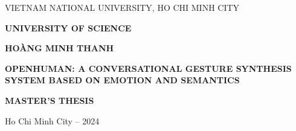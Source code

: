 \begin{titlepage}
	
	\begin{mdframed}[linewidth=1pt,
		linecolor=black,
		leftmargin=0,
		rightmargin=0,
		innertopmargin=20mm,
		innerbottommargin=20mm,
		innerleftmargin=25mm,
		innerrightmargin=25mm,
		skipabove=0,
		skipbelow=0]
		
		\centering
		\vspace*{1cm}
		
		{VIETNAM NATIONAL UNIVERSITY, HO CHI MINH CITY\par}
		\vspace{0.25cm}
		{\large \textbf{UNIVERSITY OF SCIENCE}\par}
		
		\vspace{2cm}
		
		{\large \MakeUppercase{\textbf{HOÀNG MINH THANH}}\par}
		
		\vspace{2cm}
		
		{\Large \bfseries
			\MakeUppercase{OpenHuman: A Conversational Gesture Synthesis System Based on Emotion and Semantics} \par}
		
		\vspace{3cm}
		
		{\large \bfseries
			MASTER'S THESIS\par}
		
		\vfill
		\vspace{3cm}
		
		{\small Ho Chi Minh City – 2024 \par}
	\end{mdframed}
\end{titlepage}

\pagebreak



